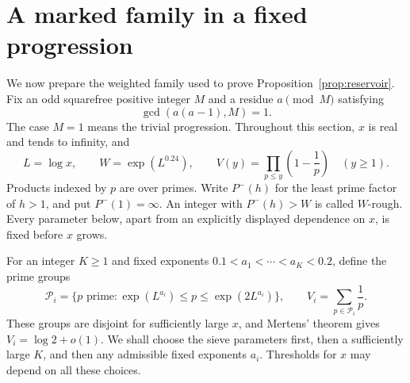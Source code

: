 \section{A marked family in a fixed progression}
\label{sec:marked-family}

We now prepare the weighted family used to prove
Proposition~\ref{prop:reservoir}.  Fix an odd squarefree positive integer
\(M\) and a residue \(a\pmod M\) satisfying
\begin{equation}\label{eq:admissible-progression}
 \gcd(a(a-1),M)=1.
\end{equation}
The case \(M=1\) means the trivial progression.  Throughout this section,
\(x\) is real and tends to infinity, and
\begin{equation}\label{eq:marked-parameters}
 L=\log x,\qquad W=\exp(L^{0.24}),\qquad
 V(y)=\prod_{p\le y}\left(1-\frac1p\right)\quad(y\ge1).
\end{equation}
Products indexed by \(p\) are over primes.  Write \(P^-(h)\) for the least
prime factor of \(h>1\), and put \(P^-(1)=\infty\).  An integer with
\(P^-(h)>W\) is called \(W\)-rough.  Every parameter below, apart from an
explicitly displayed dependence on \(x\), is fixed before \(x\) grows.

For an integer \(K\ge1\) and fixed exponents
\(0.1<a_1<\cdots<a_K<0.2\), define the prime groups
\begin{equation}\label{eq:marked-groups}
 \mathcal P_i=\{p\text{ prime}:\exp(L^{a_i})\le p\le\exp(2L^{a_i})\},
 \qquad
 V_i=\sum_{p\in\mathcal P_i}\frac1p.
\end{equation}
These groups are disjoint for sufficiently large \(x\), and Mertens'
theorem gives \(V_i=\log2+o(1)\).  We shall choose the sieve parameters
first, then a sufficiently large \(K\), and then any admissible fixed
exponents \(a_i\).  Thresholds for \(x\) may depend on all these choices.


